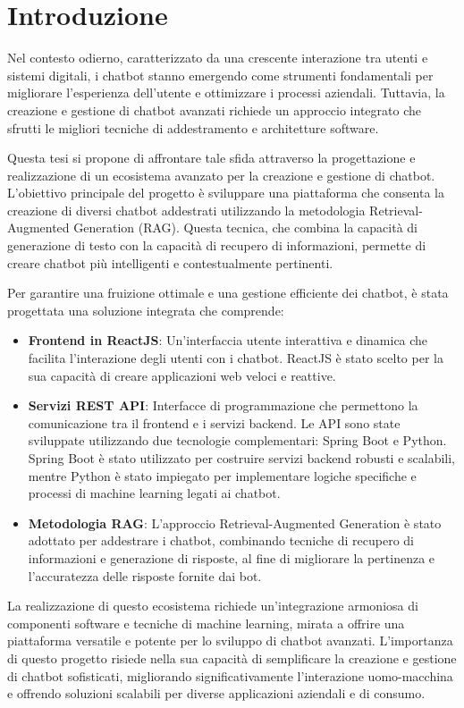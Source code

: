 \documentclass[a4paper,twoside,12pt]{toptesi}
\makeatletter
\def\cleardoublepage{\clearpage\if@twoside \ifodd\c@page\else
    \hbox{}
    \vspace*{\fill}
    \vspace{\fill}
    \thispagestyle{empty}
    \newpage
    \if@twocolumn\hbox{}\newpage\fi\fi\fi}
\makeatother
\begin{document}
\tableofcontents

\cleardoublepage

\setcounter{page}{1}

\chapter*{Introduzione}
Nel contesto odierno, caratterizzato da una crescente interazione tra utenti e sistemi digitali, i chatbot stanno emergendo come strumenti fondamentali per migliorare l'esperienza dell'utente e ottimizzare i processi aziendali. Tuttavia, la creazione e gestione di chatbot avanzati richiede un approccio integrato che sfrutti le migliori tecniche di addestramento e architetture software.

Questa tesi si propone di affrontare tale sfida attraverso la progettazione e realizzazione di un ecosistema avanzato per la creazione e gestione di chatbot. L'obiettivo principale del progetto è sviluppare una piattaforma che consenta la creazione di diversi chatbot addestrati utilizzando la metodologia Retrieval-Augmented Generation (RAG). Questa tecnica, che combina la capacità di generazione di testo con la capacità di recupero di informazioni, permette di creare chatbot più intelligenti e contestualmente pertinenti.

Per garantire una fruizione ottimale e una gestione efficiente dei chatbot, è stata progettata una soluzione integrata che comprende:
\begin{itemize}
\item \textbf{Frontend in ReactJS}: Un'interfaccia utente interattiva e dinamica che facilita l'interazione degli utenti con i chatbot. ReactJS è stato scelto per la sua capacità di creare applicazioni web veloci e reattive.

\item \textbf{Servizi REST API}: Interfacce di programmazione che permettono la comunicazione tra il frontend e i servizi backend. Le API sono state sviluppate utilizzando due tecnologie complementari: Spring Boot e Python. Spring Boot è stato utilizzato per costruire servizi backend robusti e scalabili, mentre Python è stato impiegato per implementare logiche specifiche e processi di machine learning legati ai chatbot.

\item \textbf{Metodologia RAG}: L'approccio Retrieval-Augmented Generation è stato adottato per addestrare i chatbot, combinando tecniche di recupero di informazioni e generazione di risposte, al fine di migliorare la pertinenza e l'accuratezza delle risposte fornite dai bot.
\end{itemize}
La realizzazione di questo ecosistema richiede un'integrazione armoniosa di componenti software e tecniche di machine learning, mirata a offrire una piattaforma versatile e potente per lo sviluppo di chatbot avanzati. L'importanza di questo progetto risiede nella sua capacità di semplificare la creazione e gestione di chatbot sofisticati, migliorando significativamente l'interazione uomo-macchina e offrendo soluzioni scalabili per diverse applicazioni aziendali e di consumo.
\end{document}
